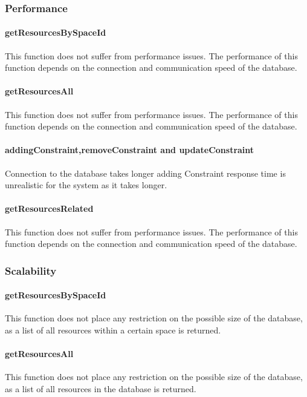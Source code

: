 \documentclass[a4paper]{article}
\begin{document}
\subsubsection {Performance}

\paragraph{getResourcesBySpaceId}
This function does not suffer from performance issues. The performance of this function depends on the connection and communication speed of the database.

\paragraph{getResourcesAll}
This function does not suffer from performance issues. The performance of this function depends on the connection and communication speed of the database.

\paragraph{addingConstraint,removeConstraint and updateConstraint}
Connection to the database takes longer adding Constraint response time is unrealistic for the system as it takes longer.

\paragraph{getResourcesRelated}
This function does not suffer from performance issues. The performance of this function depends on the connection and communication speed of the database.

\subsubsection {Scalability}

\paragraph{getResourcesBySpaceId}
This function does not place any restriction on the possible size of the database, as a list of all resources within a certain space is returned.

\paragraph{getResourcesAll}
This function does not place any restriction on the possible size of the database, as a list of all resources in the database is returned.
\end{document}
